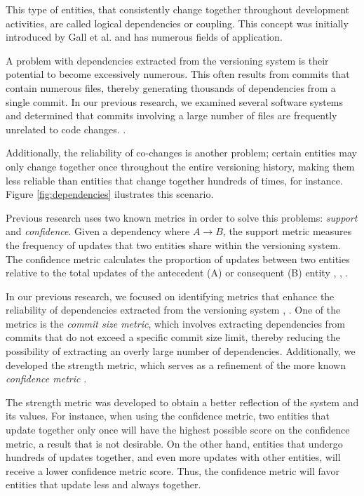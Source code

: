 \documentclass[conference]{IEEEtran}
\begin{document}
This type of entities, that consistently change together throughout development activities, are called logical dependencies or coupling. This concept was initially introduced by Gall et al. \cite{Gall:1998:DLC:850947.853338} and has numerous fields of application.

A problem with dependencies extracted from the versioning system is their potential to become excessively numerous. This often results from commits that contain numerous files, thereby generating thousands of dependencies from a single commit.
In our previous research, we examined several software systems and determined that commits involving a large number of files are frequently unrelated to code changes. \cite{enase19}.

Additionally, the reliability of co-changes is another problem; certain entities may only change together once throughout the entire versioning history, making them less reliable than entities that change together hundreds of times, for instance. Figure \ref{fig:dependencies} ilustrates this scenario.

Previous research uses two known metrics in order to solve this problems: \textit{support} and \textit{confidence}. Given a dependency where $A \rightarrow B$, the support metric measures the frequency of updates that two entities share within the versioning system. The confidence metric calculates the proportion of updates between two entities relative to the total updates of the antecedent (A) or consequent (B) entity \cite{DBLP:conf/issre/OlivaG15}, \cite{DBLP:journals/jss/AjienkaC17}, \cite{Zimmermann:2004:MVH:998675.999460}.


In our previous research, we focused on identifying metrics that enhance the reliability of dependencies extracted from the versioning system \cite{saci19}, \cite{enase19}. One of the metrics is the \textit{commit size metric}, which involves extracting dependencies from commits that do not exceed a specific commit size limit, thereby reducing the possibility of extracting an overly large number of dependencies. Additionally, we developed the strength metric, which serves as a refinement of the more known \textit{confidence metric} \cite{articlekeyclass23}.


The strength metric was developed to obtain a better reflection of the system and its values. For instance, when using the confidence metric, two entities that update together only once will have the highest possible score on the confidence metric, a result that is not desirable. On the other hand, entities that undergo hundreds of updates together, and even more updates with other entities, will receive a lower confidence metric score. Thus, the confidence metric will favor entities that update less and always together.
\end{document}
